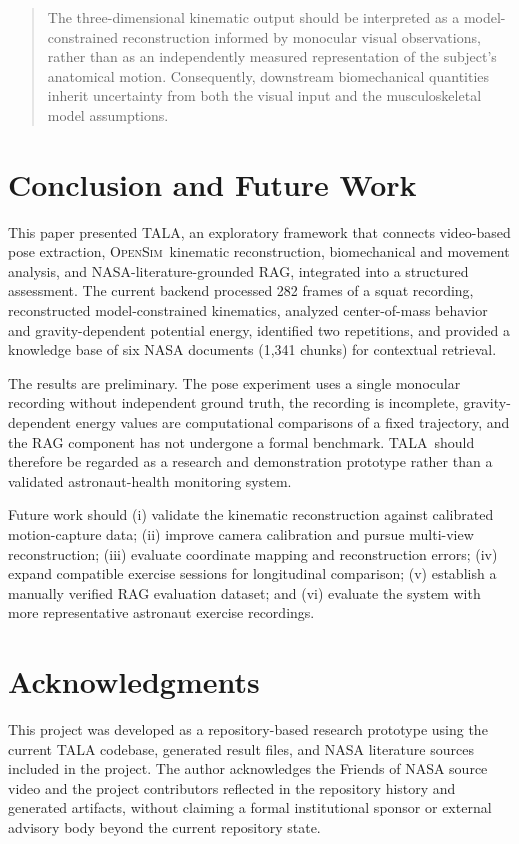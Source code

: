 \documentclass[11pt,a4paper]{article}
\newcommand{\TALA}{\textsc{TALA}}
\newcommand{\OpenSim}{\textsc{OpenSim}}
\begin{document}
\begin{quote}
The three-dimensional kinematic output should be interpreted as a model-constrained reconstruction informed by monocular visual observations, rather than as an independently measured representation of the subject's anatomical motion. Consequently, downstream biomechanical quantities inherit uncertainty from both the visual input and the musculoskeletal model assumptions.
\end{quote}

\section{Conclusion and Future Work}

This paper presented \TALA, an exploratory framework that connects video-based pose extraction, \OpenSim\ kinematic reconstruction, biomechanical and movement analysis, and NASA-literature-grounded RAG, integrated into a structured assessment. The current backend processed 282 frames of a squat recording, reconstructed model-constrained kinematics, analyzed center-of-mass behavior and gravity-dependent potential energy, identified two repetitions, and provided a knowledge base of six NASA documents (1,341 chunks) for contextual retrieval.

The results are preliminary. The pose experiment uses a single monocular recording without independent ground truth, the recording is incomplete, gravity-dependent energy values are computational comparisons of a fixed trajectory, and the RAG component has not undergone a formal benchmark. \TALA\ should therefore be regarded as a research and demonstration prototype rather than a validated astronaut-health monitoring system.

Future work should (i) validate the kinematic reconstruction against calibrated motion-capture data; (ii) improve camera calibration and pursue multi-view reconstruction; (iii) evaluate coordinate mapping and reconstruction errors; (iv) expand compatible exercise sessions for longitudinal comparison; (v) establish a manually verified RAG evaluation dataset; and (vi) evaluate the system with more representative astronaut exercise recordings.

\section*{Acknowledgments}
This project was developed as a repository-based research prototype using the current TALA codebase, generated result files, and NASA literature sources included in the project. The author acknowledges the Friends of NASA source video and the project contributors reflected in the repository history and generated artifacts, without claiming a formal institutional sponsor or external advisory body beyond the current repository state.
\end{document}
